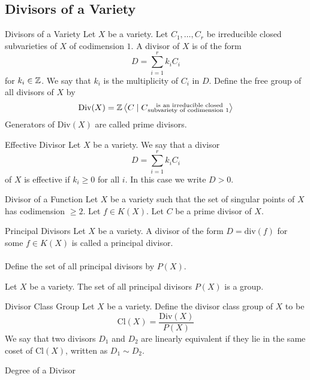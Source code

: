 \documentclass[a4paper]{article}
\begin{document}
\subsection{Divisors of a Variety}
\begin{defn}{Divisors of a Variety}{} Let $X$ be a variety. Let $C_1,\dots,C_r$ be irreducible closed subvarieties of $X$ of codimension $1$. A divisor of $X$ is of the form $$D=\sum_{i=1}^rk_iC_i$$ for $k_i\in\mathbb{Z}$. We say that $k_i$ is the multiplicity of $C_i$ in $D$. Define the free group of all divisors of $X$ by $$\text{Div}(X)=\mathbb{Z}\left\langle C\;|\;C\substack{\text{ is an irreducible closed}\\\text{subvariety of codimension }1}\right\rangle$$ Generators of $\text{Div}(X)$ are called prime divisors. 
\end{defn}

\begin{defn}{Effective Divisor}{} Let $X$ be a variety. We say that a divisor $$D=\sum_{i=1}^rk_iC_i$$ of $X$ is effective if $k_i\geq 0$ for all $i$. In this case we write $D>0$. 
\end{defn}

\begin{defn}{Divisor of a Function}{} Let $X$ be a variety such that the set of singular points of $X$ has codimension $\geq 2$. Let $f\in K(X)$. Let $C$ be a prime divisor of $X$. 
\end{defn}

\begin{defn}{Principal Divisors}{} Let $X$ be a variety. A divisor of the form $D=\text{div}(f)$ for some $f\in K(X)$ is called a principal divisor. \\~\\
Define the set of all principal divisors by $P(X)$. 
\end{defn}

\begin{prp}{}{} Let $X$ be a variety. The set of all principal divisors $P(X)$ is a group. 
\end{prp}

\begin{defn}{Divisor Class Group}{} Let $X$ be a variety. Define the divisor class group of $X$ to be $$\text{Cl}(X)=\frac{\text{Div}(X)}{P(X)}$$
We say that two divisors $D_1$ and $D_2$ are linearly equivalent if they lie in the same coset of $\text{Cl}(X)$, written as $D_1\sim D_2$. 
\end{defn}

\begin{defn}{Degree of a Divisor}{}
\end{defn}
\end{document}
